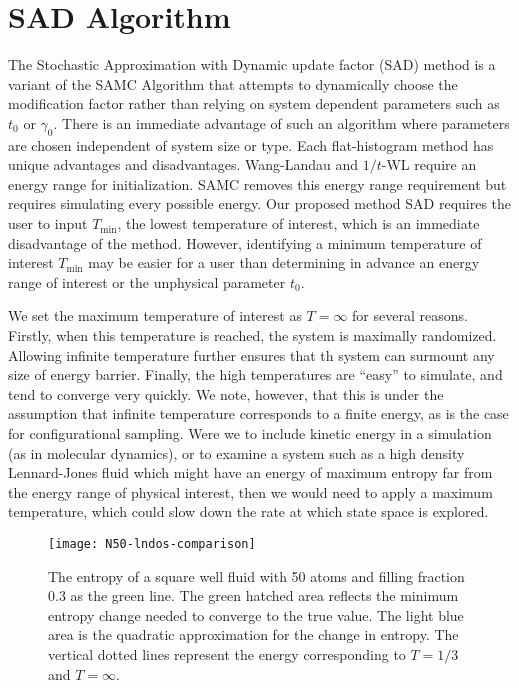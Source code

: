 \documentclass[letterpaper,twocolumn,amsmath,amssymb,pre,aps,10pt]{revtex4-1}
\begin{document}
\section{SAD Algorithm}\label{sec:sad}
The Stochastic Approximation with Dynamic update factor (SAD) method
is a variant of the SAMC Algorithm that attempts to dynamically choose
the modification factor rather than relying on system dependent
parameters such as $t_0$ or $\gamma_0$.  There is an immediate
advantage of such an algorithm where parameters are chosen independent
of system size or type. Each flat-histogram method has unique
advantages and disadvantages.  Wang-Landau and $1/t$-WL require an
energy range for initialization.  SAMC removes this energy range
requirement but requires simulating every possible energy. Our
proposed method SAD requires the user to input $T_\text{min}$, the
lowest temperature of interest, which is an immediate disadvantage of
the method. However, identifying a minimum temperature of interest
$T_\text{min}$ may be easier for a user than determining in advance
an energy range of interest or the unphysical parameter $t_0$.

We set the maximum temperature of interest as $T=\infty$ for several reasons.
Firstly, when this temperature is reached, the system is maximally randomized.
Allowing infinite temperature further ensures that th system can surmount any
size of energy barrier.  Finally, the high temperatures are ``easy'' to simulate,
and tend to converge very quickly.  We note, however, that this is under the
assumption that infinite temperature corresponds to a finite energy, as is the
case for configurational sampling.  Were we to include kinetic energy in a
simulation (as in molecular dynamics), or to examine a system such as a high
density Lennard-Jones fluid which might have an energy of maximum entropy far
from the energy range of physical interest, then we would need to apply a maximum
temperature, which could slow down the rate at which state space is explored.

\begin{figure}
  \texttt{[image: N50-lndos-comparison]}
  \caption{The entropy of a square well fluid with 50 atoms and filling fraction
        0.3 as the green line.  The green hatched area reflects the
        minimum entropy change needed to converge to the true value.
        The light blue area is the quadratic approximation
        for the change in entropy.  The vertical dotted lines represent
        the energy corresponding to $T=1/3$ and $T=\infty$.}
  \label{fig:entropy-cartoon}
\end{figure}
\end{document}
